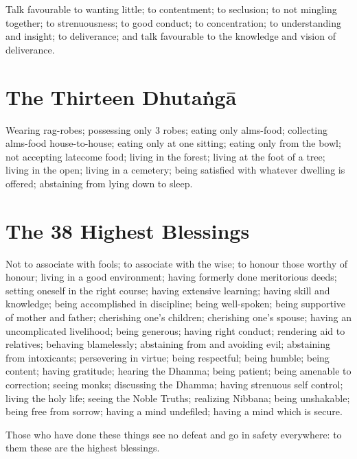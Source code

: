 Talk favourable to wanting little; to contentment; to seclusion; to not mingling
together; to strenuousness; to good conduct; to concentration; to understanding
and insight; to deliverance; and talk favourable to the knowledge and vision of
deliverance.


\section{The Thirteen Dhutaṅgā}

Wearing rag-robes; possessing only 3 robes; eating only alms-food; collecting
alms-food house-to-house; eating only at one sitting; eating only from the bowl;
not accepting latecome food; living in the forest; living at the foot of a tree;
living in the open; living in a cemetery; being satisfied with whatever dwelling
is offered; abstaining from lying down to sleep.


\section{The 38 Highest Blessings}

Not to associate with fools;
to associate with the wise;
to honour those worthy of honour;
living in a good environment;
having formerly done meritorious deeds;
setting oneself in the right course;
having extensive learning;
having skill and knowledge;
being accomplished in discipline;
being well-spoken;
being supportive of mother and father;
cherishing one's children;
cherishing one's spouse;
having an uncomplicated livelihood;
being generous;
having right conduct;
rendering aid to relatives;
behaving blamelessly;
abstaining from and avoiding evil;
abstaining from intoxicants;
persevering in virtue;
being respectful;
being humble;
being content;
having gratitude;
hearing the Dhamma;
being patient;
being amenable to correction;
seeing monks;
discussing the Dhamma;
having strenuous self control;
living the holy life;
seeing the Noble Truths;
realizing Nibbana;
being unshakable;
being free from sorrow;
having a mind undefiled;
having a mind which is secure.

Those who have done these things see no defeat and go in safety everywhere: to
them these are the highest blessings.


